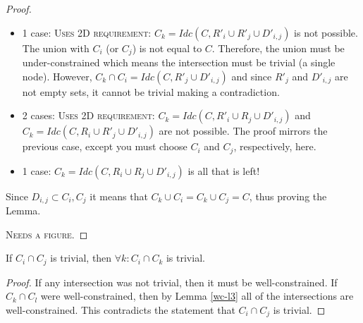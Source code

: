 \documentclass[11pt]{article}
\newcommand{\todo}[1]{\textsc{{\color{red}#1}}}
\begin{document}
\begin{proof}
\begin{itemize}
    \item 1 case: \todo{Uses 2D requirement:} $C_k=Idc(C,R'_i\cup R'_j\cup D'_{i,j})$ is not possible. The union with $C_i$ (or $C_j$) is not equal to $C$. Therefore, the union must be under-constrained which means the intersection must be trivial (a single node). However, $C_k\cap C_i=Idc(C,R'_j\cup D'_{i,j})$ and since $R'_j$ and $D'_{i,j}$ are not empty sets, it cannot be trivial making a contradiction.

    \item 2 cases: \todo{Uses 2D requirement:} $C_k=Idc(C,R'_i\cup R_j\cup D'_{i,j})$ and $C_k=Idc(C,R_i\cup R'_j\cup D'_{i,j})$ are not possible. The proof mirrors the previous case, except you must choose $C_i$ and $C_j$, respectively, here.

    \item 1 case: $C_k=Idc(C,R_i\cup R_j\cup D'_{i,j})$ is all that is left!
\end{itemize}

Since $D_{i,j}\subset C_i, C_j$ it means that $C_k\cup C_i = C_k \cup C_j = C$, thus proving the Lemma.

\todo{Needs a figure.}
\end{proof}








\begin{lemma}\label{uc-l2}
If $C_i\cap C_j$ is trivial, then $\forall k: C_i\cap C_k$ is trivial.
\end{lemma}

\begin{proof}
If any intersection was not trivial, then it must be well-constrained. If $C_k\cap C_l$ were well-constrained, then by Lemma \ref{wc-l3} all of the intersections are well-constrained. This contradicts the statement that $C_i\cap C_j$ is trivial.
\end{proof}
\end{document}

